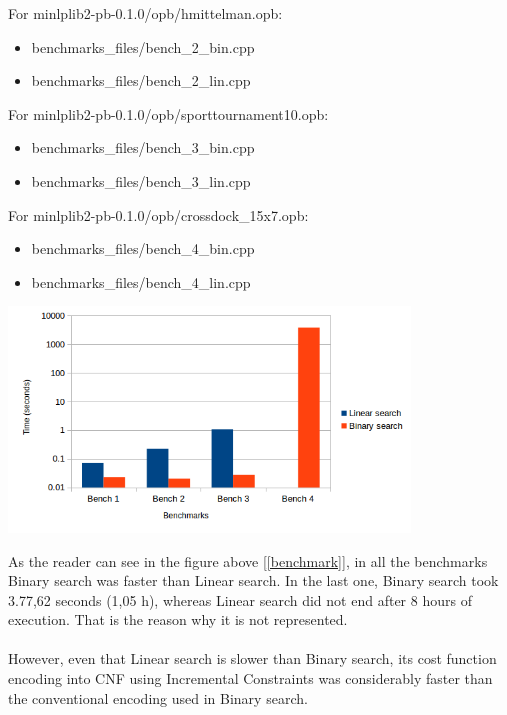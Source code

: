For minlplib2-pb-0.1.0/opb/hmittelman.opb:
\begin{itemize}
	\item benchmarks\_files/bench\_2\_bin.cpp
	\item benchmarks\_files/bench\_2\_lin.cpp
\end{itemize}
For minlplib2-pb-0.1.0/opb/sporttournament10.opb:
\begin{itemize}
	\item benchmarks\_files/bench\_3\_bin.cpp
	\item benchmarks\_files/bench\_3\_lin.cpp
\end{itemize}
For minlplib2-pb-0.1.0/opb/crossdock\_15x7.opb:
\begin{itemize}
	\item benchmarks\_files/bench\_4\_bin.cpp
	\item benchmarks\_files/bench\_4\_lin.cpp
\end{itemize}


\begin{center}
	\includegraphics[width=0.8\textwidth]{Figures/benchmarks.png}
	\label{benchmark}
\end{center}
As the reader can see in the figure above [\ref{benchmark}], in all the benchmarks Binary search was faster than Linear search. In the last one, Binary search took 3.77,62 seconds (1,05 h), whereas Linear search did not end after 8 hours of execution. That is the reason why it is not represented.\\\\
However, even that Linear search is slower than Binary search, its cost function encoding into CNF using Incremental Constraints was considerably faster than the conventional encoding used in Binary search. 